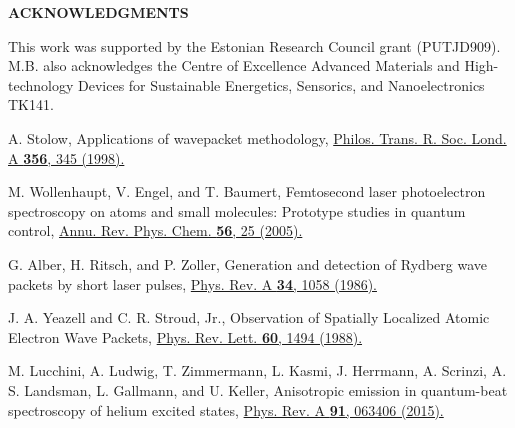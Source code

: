 \documentclass[7pt]{article}
\begin{document}
\begin{multicols}{2}
\begin{center}
    {\textbf{ACKNOWLEDGMENTS}}
\end{center}

This work was supported by the Estonian Research Council grant (PUTJD909). M.B. also acknowledges the Centre of Excellence Advanced Materials and High-technology Devices for Sustainable Energetics, Sensorics, and Nanoelectronics TK141.
\end{multicols}

\centering{\rule{87mm}{0.1mm}}

\begin{multicols}{2}

\def\refname{}

\begin{thebibliography}{30} %

\small

\vspace{-7mm}

\bibitem{} A. Stolow, Applications of wavepacket methodology, \href{https://royalsocietypublishing.org/doi/10.1098/rsta.1998.0169}{Philos.
Trans. R. Soc. Lond. A \textbf{356}, 345 (1998).}
\vspace{-1.5mm}

\bibitem{} M. Wollenhaupt, V. Engel, and T. Baumert, Femtosecond laser
photoelectron spectroscopy on atoms and small molecules: Prototype studies in quantum control,  \href{https://www.annualreviews.org/doi/10.1146/annurev.physchem.56.092503.141315}{Annu. Rev. Phys. Chem. \textbf{56},
25 (2005).}
\vspace{-1.5mm}

\bibitem{} G. Alber, H. Ritsch, and P. Zoller, Generation and detection of
Rydberg wave packets by short laser pulses, \href{https://journals.aps.org/pra/abstract/10.1103/PhysRevA.34.1058}{Phys. Rev. A \textbf{34},
1058 (1986).}
\vspace{-1.5mm}

\bibitem{} J. A. Yeazell and C. R. Stroud, Jr., Observation of Spatially
Localized Atomic Electron Wave Packets, \href{https://journals.aps.org/prl/abstract/10.1103/PhysRevLett.60.1494}{Phys. Rev. Lett. \textbf{60},
1494 (1988).}
\vspace{-1.5mm}

\bibitem{} M. Lucchini, A. Ludwig, T. Zimmermann, L. Kasmi, J.
Herrmann, A. Scrinzi, A. S. Landsman, L. Gallmann, and U.
Keller, Anisotropic emission in quantum-beat spectroscopy of
helium excited states, \href{https://journals.aps.org/pra/abstract/10.1103/PhysRevA.91.063406}{Phys. Rev. A \textbf{91}, 063406 (2015).}
\vspace{-1.5mm}


\end{thebibliography}
\end{multicols}
\end{document}
